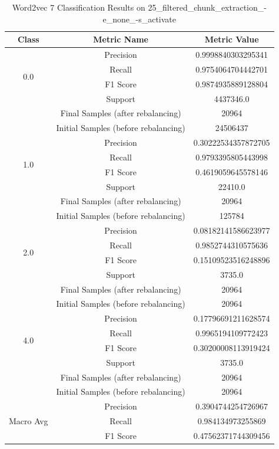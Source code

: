 \begin{longtable}{|c|c|c|}
\caption{Word2vec 7 Classification Results on 25\_filtered\_chunk\_extraction\_-e\_none\_-s\_activate} \label{tab:25_filtered_chunk_extraction_-e_none_-s_activate_word2vec_7_classifiers_results} \\
\hline
Class & Metric Name & Metric Value \\
\hline
\multirow{4}{*}{0.0} & Precision & 0.9998840303295341 \\
 & Recall & 0.9754064704442701 \\
 & F1 Score & 0.9874935889128804 \\
 & Support & 4437346.0 \\
 & Final Samples (after rebalancing) & 20964 \\
 & Initial Samples (before rebalancing) & 24506437 \\
\hline
\multirow{4}{*}{1.0} & Precision & 0.30222534357872705 \\
 & Recall & 0.9793395805443998 \\
 & F1 Score & 0.4619059645578146 \\
 & Support & 22410.0 \\
 & Final Samples (after rebalancing) & 20964 \\
 & Initial Samples (before rebalancing) & 125784 \\
\hline
\multirow{4}{*}{2.0} & Precision & 0.08182141586623977 \\
 & Recall & 0.9852744310575636 \\
 & F1 Score & 0.15109523516248896 \\
 & Support & 3735.0 \\
 & Final Samples (after rebalancing) & 20964 \\
 & Initial Samples (before rebalancing) & 20964 \\
\hline
\multirow{4}{*}{4.0} & Precision & 0.17796691211628574 \\
 & Recall & 0.9965194109772423 \\
 & F1 Score & 0.30200008113919424 \\
 & Support & 3735.0 \\
 & Final Samples (after rebalancing) & 20964 \\
 & Initial Samples (before rebalancing) & 20964 \\
\hline
\multirow{4}{*}{Macro Avg} & Precision & 0.3904744254726967 \\
 & Recall & 0.984134973255869 \\
 & F1 Score & 0.47562371744309456 \\

\end{longtable}
